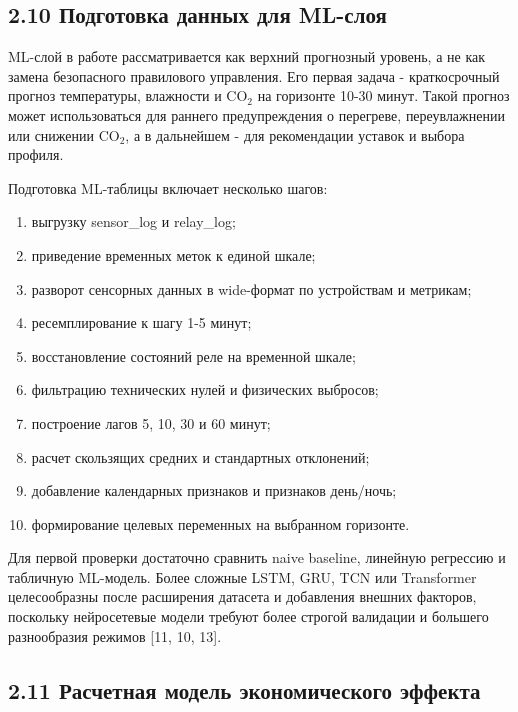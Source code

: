 \documentclass[a4paper,14pt]{extarticle}
\renewcommand{\texttt}[1]{\textnormal{#1}}
\providecommand{\tightlist}{%
  \setlength{\itemsep}{0pt}\setlength{\parskip}{0pt}}
\begin{document}
\hypertarget{ux43fux43eux434ux433ux43eux442ux43eux432ux43aux430-ux434ux430ux43dux43dux44bux445-ux434ux43bux44f-ml-ux441ux43bux43eux44f}{%
\subsection{2.10 Подготовка данных для
ML-слоя}\label{ux43fux43eux434ux433ux43eux442ux43eux432ux43aux430-ux434ux430ux43dux43dux44bux445-ux434ux43bux44f-ml-ux441ux43bux43eux44f}}

ML-слой в работе рассматривается как верхний прогнозный уровень, а не
как замена безопасного правилового управления. Его первая задача -
краткосрочный прогноз температуры, влажности и CO\(_2\) на горизонте
10-30 минут. Такой прогноз может использоваться для раннего
предупреждения о перегреве, переувлажнении или снижении CO\(_2\), а в
дальнейшем - для рекомендации уставок и выбора профиля.

Подготовка ML-таблицы включает несколько шагов:

\begin{enumerate}
\def\labelenumi{\arabic{enumi})}
\tightlist
\item
  выгрузку \texttt{sensor\_log} и \texttt{relay\_log};
\item
  приведение временных меток к единой шкале;
\item
  разворот сенсорных данных в wide-формат по устройствам и метрикам;
\item
  ресемплирование к шагу 1-5 минут;
\item
  восстановление состояний реле на временной шкале;
\item
  фильтрацию технических нулей и физических выбросов;
\item
  построение лагов 5, 10, 30 и 60 минут;
\item
  расчет скользящих средних и стандартных отклонений;
\item
  добавление календарных признаков и признаков день/ночь;
\item
  формирование целевых переменных на выбранном горизонте.
\end{enumerate}

Для первой проверки достаточно сравнить naive baseline, линейную
регрессию и табличную ML-модель. Более сложные LSTM, GRU, TCN или
Transformer целесообразны после расширения датасета и добавления внешних
факторов, поскольку нейросетевые модели требуют более строгой валидации
и большего разнообразия режимов {[}11, 10, 13{]}.

\hypertarget{ux440ux430ux441ux447ux435ux442ux43dux430ux44f-ux43cux43eux434ux435ux43bux44c-ux44dux43aux43eux43dux43eux43cux438ux447ux435ux441ux43aux43eux433ux43e-ux44dux444ux444ux435ux43aux442ux430}{%
\subsection{2.11 Расчетная модель экономического
эффекта}\label{ux440ux430ux441ux447ux435ux442ux43dux430ux44f-ux43cux43eux434ux435ux43bux44c-ux44dux43aux43eux43dux43eux43cux438ux447ux435ux441ux43aux43eux433ux43e-ux44dux444ux444ux435ux43aux442ux430}}
\end{document}
